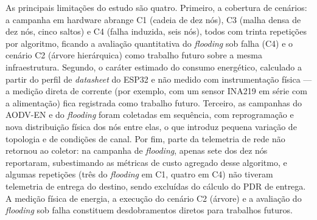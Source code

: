 As principais limitações do estudo são quatro. Primeiro, a cobertura de
cenários: a campanha em hardware abrange C1 (cadeia de dez nós), C3 (malha
densa de dez nós, cinco saltos) e C4 (falha induzida, seis nós), todos com
trinta repetições por algoritmo, ficando a avaliação quantitativa do
\emph{flooding} sob falha (C4) e o cenário C2 (árvore hierárquica) como
trabalho futuro sobre a mesma infraestrutura. Segundo, o caráter estimado do
consumo energético, calculado a partir do perfil de \emph{datasheet} do ESP32
e não medido com instrumentação física --- a medição direta de corrente (por
exemplo, com um sensor INA219 em série com a alimentação) fica registrada como
trabalho futuro. Terceiro, as campanhas do AODV-EN e do \emph{flooding} foram
coletadas em sequência, com reprogramação e nova distribuição física dos nós
entre elas, o que introduz pequena variação de topologia e de condições de
canal. Por fim, parte da telemetria de rede não retornou ao coletor: na
campanha de \emph{flooding}, apenas sete dos dez nós reportaram, subestimando
as métricas de custo agregado desse algoritmo, e algumas repetições (três do
\emph{flooding} em C1, quatro em C4) não tiveram telemetria de entrega do
destino, sendo excluídas do cálculo do PDR de entrega. A medição física de
energia, a execução do cenário C2 (árvore) e a avaliação do \emph{flooding}
sob falha constituem desdobramentos diretos para trabalhos futuros.
